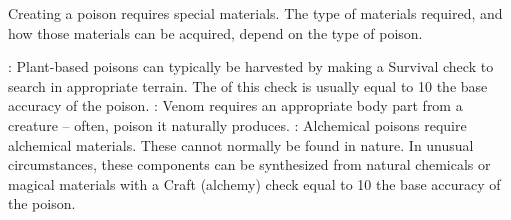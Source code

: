             Creating a poison requires special materials.
            The type of materials required, and how those materials can be acquired, depend on the type of poison.

            \begin{itemize}
                : Plant-based poisons can typically be harvested by making a Survival check to search in appropriate terrain.
                    The  of this check is usually equal to 10 \add the base accuracy of the poison.
                : Venom requires an appropriate body part from a creature -- often, poison it naturally produces.
                : Alchemical poisons require alchemical materials.
                    These cannot normally be found in nature.
                    In unusual circumstances, these components can be synthesized from natural chemicals or magical materials with a Craft (alchemy) check equal to 10 \add the base accuracy of the poison.
            \end{itemize}
